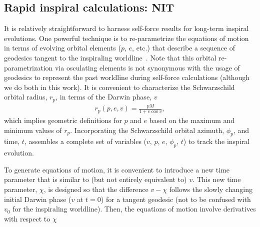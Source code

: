 \documentclass[aps,prd,twocolumn,showpacs,notitlepage,eqsecnum,
superscriptaddress,nofootinbib]{revtex4-1}
\begin{document}
\subsection{Rapid inspiral calculations: NIT}
\label{sec:nit}

It is relatively straightforward to harness self-force results for long-term inspiral evolutions. One powerful technique is to re-parametrize the equations of motion in terms of evolving orbital elements ($p$, $e$, etc.) that describe a sequence of geodesics tangent to the inspiraling worldline~\cite{PounPois08,GairFlan11}. Note that this orbital re-parametrization via osculating elements is not synonymous with the usage of geodesics to represent the past worldline during self-force calculations (although we do both in this work). It is convenient to characterize the Schwarzschild orbital radius, $r_p$, in terms of the Darwin phase, $v$~\cite{Darw59,Darw61}
\begin{align}
\label{eq:dar}
r_p(p,e,v) = \frac{pM}{1+e \cos{v}} ,
\end{align}
which implies geometric definitions for $p$ and $e$ based on the maximum and minimum values of $r_p$. Incorporating the Schwarzschild orbital azimuth, $\phi_p$, and time, $t$, assembles a complete set of variables ($v$, $p$, $e$, $\phi_p$, $t$) to track the inspiral evolution.

To generate equations of motion, it is convenient to introduce a new time parameter that is similar to (but not entirely equivalent to) $v$. This new time parameter, $\chi$, is designed so that the difference $v-\chi$ follows the slowly changing initial Darwin phase ($v$ at $t=0$) for a tangent geodesic (not to be confused with $v_0$ for the inspiraling worldline). Then, the equations of motion involve derivatives with respect to $\chi$ 
\end{document}
